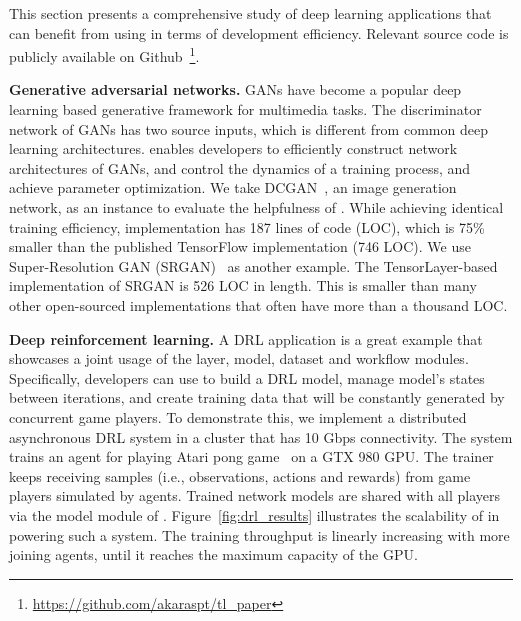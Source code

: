 This section presents a comprehensive study of
deep learning applications that can benefit from using \tl in terms of development efficiency. 
Relevant source code is %
publicly available on Github~\footnote{\url{https://github.com/akaraspt/tl\_paper}}.

\textbf{Generative adversarial networks.}
GANs have become a popular deep learning based generative framework for multimedia tasks.
The discriminator network of GANs has two source inputs, which is different from common deep learning architectures. 
\tl enables developers to efficiently construct network architectures of GANs, 
and control the dynamics of a training process, and achieve parameter optimization. 
We take DCGAN~\cite{radford2015dcgan}, an image generation network, 
as an instance to evaluate the helpfulness of \tl. While achieving identical training efficiency, \tl implementation has 187 lines of code (LOC), 
which is 75\% smaller than the published TensorFlow implementation (746 LOC). 
We use Super-Resolution GAN (SRGAN)~\cite{Ledig2016srgan} as another example. The TensorLayer-based implementation of SRGAN is 526 LOC in length. This is smaller than many other open-sourced implementations that often have more than a thousand LOC.


\textbf{Deep reinforcement learning.} A DRL application is a great example that showcases a joint usage of the layer, model, dataset and workflow modules. 
Specifically, developers can use \tl to build a DRL model, manage model's states between iterations, and create training data that will be constantly generated by concurrent game players.
To demonstrate this, we implement a distributed asynchronous DRL system %
 in a cluster that has 10 Gbps connectivity. 
The system trains an agent for playing Atari pong game~\cite{pingpixel2016} on a GTX 980 GPU.
The trainer keeps receiving samples (i.e., observations, actions and rewards)
from game players simulated by \tl agents. 
Trained network models are shared with all players %
via the model module of \tl.
Figure~\ref{fig:drl_results} illustrates the scalability of \tl in powering such a system. The training throughput is linearly increasing with more joining agents, until %
it reaches the maximum capacity of the GPU. 



